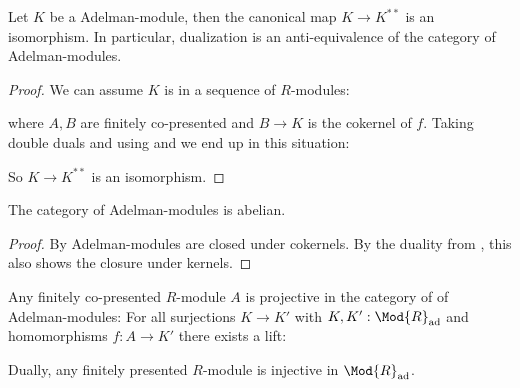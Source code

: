 \begin{theorem}
  \label{coherent-self-dual}
  Let $K$ be a Adelman-module, then the canonical map $K\to K^{\ast\ast}$ is an isomorphism.
  In particular, dualization is an anti-equivalence of the category of Adelman-modules.
\end{theorem}

\begin{proof}
  We can assume $K$ is in a sequence of $R$-modules:
  \begin{center}
  \end{center}
  where $A,B$ are finitely co-presented and $B\to K$ is the cokernel of $f$.
  Taking double duals and using  and  we end up in this situation:
  \begin{center}
  \end{center}
  So $K\to K^{\ast\ast}$ is an isomorphism.
\end{proof}

\begin{theorem}
  \label{coherent-R-modules-abelian}
  The category of Adelman-modules is abelian.
\end{theorem}

\begin{proof}
  By  Adelman-modules are closed under cokernels.
  By the duality from , this also shows the closure under kernels.
\end{proof}

\begin{lemma}
  \label{fcp-projective-fp-injective}
  Any finitely co-presented $R$-module $A$ is projective in the category of of Adelman-modules:
  For all surjections $K\to K'$ with $K,K':\Mod{R}_{\mathrm{ad}}$ and homomorphisms $f:A\to K'$ there exists a lift:
  \begin{center}
\end{center}
  Dually, any finitely presented $R$-module is injective in $\Mod{R}_{\mathrm{ad}}$.
\end{lemma}

